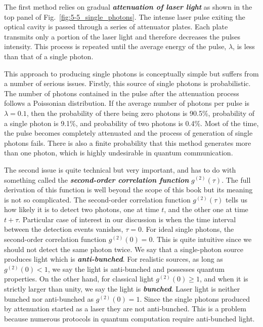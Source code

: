 The first method relies on gradual \textit{\textbf{attenuation of laser light}} as shown in
the top panel of Fig.~\ref{fig:5-5_single_photons}.
The intense laser pulse exiting the optical cavity is passed through a series of attenuator plates.
Each plate transmits only a portion of the laser light and therefore decreases the pulses intensity.
This process is repeated until the average energy of the pulse, $\lambda$, is less than that of a single photon.

This approach to producing single photons is conceptually simple but suffers from a number of serious issues.
Firstly, this source of single photons is probabilistic.
The number of photons contained in the pulse after the attenuation process follows a Poissonian distribution.
If the average number of photons per pulse is $\lambda = 0.1$, then the probability of there being zero photons is 90.5\%, probability of a single photon is 9.1\%, and probability of two photons is 0.4\%.
Most of the time, the pulse becomes completely attenuated and the process of generation of single photons fails.
There is also a finite probability that this method generates more than one photon, which is highly undesirable in quantum communication.

The second issue is quite technical but very important, and has to do with something called the \textit{\textbf{second-order correlation function}} $g^{(2)}(\tau)$.
The full derivation of this function is well beyond the scope of this book but its meaning is not so complicated.
The second-order correlation function $g^{(2)}(\tau)$ tells us how likely it is to detect two photons, one at time $t$, and the other one at time $t+\tau$.
Particular case of interest in our discussion is when the time interval between the detection events vanishes, $\tau = 0$.
For ideal single photons, the second-order correlation function $g^{(2)}(0) = 0$.
This is quite intuitive since we should not detect the same photon twice.
We say that a single-photon source produces light which is \textit{\textbf{anti-bunched}}.
For realistic sources, as long as $g^{(2)}(0) < 1$, we say the light is anti-bunched and possesses quantum properties.
On the other hand, for classical light $g^{(2)}(0) \geq 1$, and when it is strictly larger than unity, we say the light is \textit{\textbf{bunched}}.
Laser light is neither bunched nor anti-bunched as $g^{(2)}(0)=1$.
Since the single photons produced by attenuation started as a laser they are not anti-bunched.
This is a problem because numerous protocols in quantum computation require anti-bunched light.

